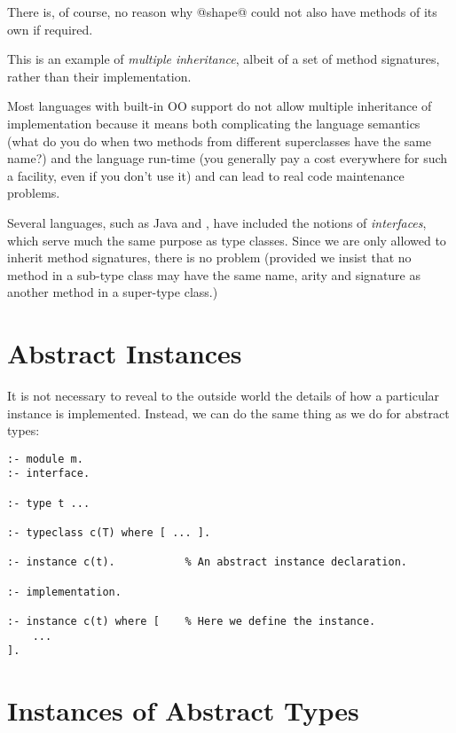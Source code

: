 There is, of course, no reason why @shape@ could not also have methods
of its own if required.

This is an example of \emph{multiple inheritance}, albeit of a set of
method signatures, rather than their implementation.

Most languages with built-in OO support do not allow multiple
inheritance of implementation because it means both complicating the
language semantics (what do you do when two methods from different
superclasses have the same name?) and the language run-time (you
generally pay a cost everywhere for such a facility, even if you don't
use it) and can lead to real code maintenance problems.

Several languages, such as Java and \Csharp, have included the notions of
\emph{interfaces}, which serve much the same purpose as type classes.
Since we are only allowed to inherit method signatures, there is no
problem (provided we insist that no method in a sub-type class may have the
same name, arity and signature as another method in a super-type class.)

\section{Abstract Instances}

It is not necessary to reveal to the outside world the details of how a
particular instance is implemented.  Instead, we can do the same thing
as we do for abstract types:
\begin{verbatim}
:- module m.
:- interface.

:- type t ...

:- typeclass c(T) where [ ... ].

:- instance c(t).           % An abstract instance declaration.

:- implementation.

:- instance c(t) where [    % Here we define the instance.
    ...
].
\end{verbatim}

\section{Instances of Abstract Types}

